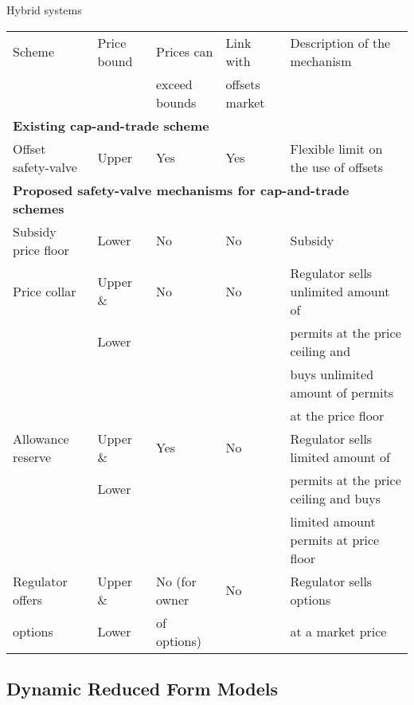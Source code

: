 {Hybrid systems }
{\tiny
\begin{table}
\centering
\begin{tabular}{|l|l|l|l|l|}
\hline
Scheme & Price bound & Prices can & Link with & Description of the mechanism \\
 &  & exceed bounds & offsets market &  \\
\hline
\hline
\multicolumn{5}{|l|}{\textbf{Existing cap-and-trade scheme}} \\
\hline
Offset safety-valve & Upper & Yes & Yes & Flexible limit on the use of offsets \\
\hline
\hline
\multicolumn{5}{|l|}{\textbf{Proposed safety-valve mechanisms for cap-and-trade schemes}} \\
\hline
Subsidy price floor & Lower & No & No & Subsidy \\
\hline
Price collar & Upper \&  & No & No & Regulator sells unlimited amount of \\
& Lower & & &                                   permits at the price ceiling and\\
  &   &  &  &                               buys unlimited amount of permits    \\
 &   &  &  &                              at the price floor \\
\hline
Allowance reserve & Upper \&  & Yes & No & Regulator sells limited amount of  \\
 & Lower  & &  &                                     permits at the price ceiling and buys  \\
 &   & &  &                                     limited amount permits at price floor \\
\hline
Regulator offers  & Upper \&  & No (for owner & No & Regulator sells options  \\
options                        &       Lower         & of options)    &    &  at a market price\\
\hline
\end{tabular}
\end{table}
}

\subsection{Dynamic Reduced Form Models}

